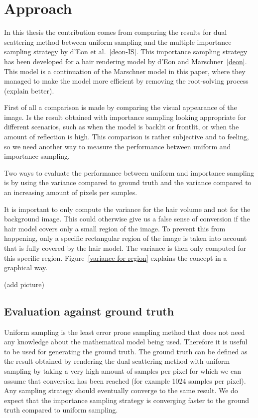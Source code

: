 \documentclass[11pt,a4paper]{report}
\begin{document}
\chapter{Approach}

In this thesis the contribution comes from comparing the results for dual scattering method between uniform sampling and the multiple importance sampling strategy by d'Eon et al.~\ref{deon-IS}. This importance sampling strategy has been developed for a hair rendering model by d'Eon and Marschner~\ref{deon}. This model is a continuation of the Marschner model in this paper, where they managed to make the model more efficient by removing the root-solving process (explain better).

First of all a comparison is made by comparing the visual appearance of the image. Is the result obtained with importance sampling looking appropriate for different scenarios, such as when the model is backlit or frontlit, or when the amount of reflection is high. This comparison is rather subjective and to feeling, so we need another way to measure the performance between uniform and importance sampling.

Two ways to evaluate the performance between uniform and importance sampling is by using the variance compared to ground truth and the variance compared to an increasing amount of pixels per samples.

It is important to only compute the variance for the hair volume and not for the background image. This could otherwise give us a false sense of conversion if the hair model covers only a small region of the image. To prevent this from happening, only a specific rectangular region of the image is taken into account that is fully covered by the hair model. The variance is then only computed for this specific region. Figure~\ref{variance-for-region} explains the concept in a graphical way.

(add picture)


\section{Evaluation against ground truth}

Uniform sampling is the least error prone sampling method that does not need any knowledge about the mathematical model being used. Therefore it is useful to be used for generating the ground truth. The ground truth can be defined as the result obtained by rendering the dual scattering method with uniform sampling by taking a very high amount of samples per pixel for which we can assume that conversion has been reached (for example 1024 samples per pixel).  Any sampling strategy should eventually converge to the same result. We do expect that the importance sampling strategy is converging faster to the ground truth compared to uniform sampling.
\end{document}
